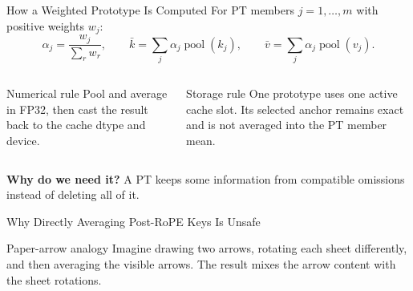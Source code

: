 \documentclass[aspectratio=169,10pt]{beamer}
\newcommand{\whylabel}{\textbf{Why do we need it?}}
\begin{document}
\begin{frame}{How a Weighted Prototype Is Computed}
\small
For PT members $j=1,\dots,m$ with positive weights $w_j$:
\[
\alpha_j=\frac{w_j}{\sum_rw_r},\qquad
\bar{k}=\sum_j\alpha_j\operatorname{pool}(k_j),\qquad
\bar{v}=\sum_j\alpha_j\operatorname{pool}(v_j).
\]
\begin{columns}[T,onlytextwidth]
\begin{block}{Numerical rule}
Pool and average in FP32, then cast the result back to the cache dtype and device.
\end{block}
\begin{block}{Storage rule}
One prototype uses one active cache slot. Its selected anchor remains exact and is not averaged
into the PT member mean.
\end{block}
\end{columns}
\begin{alertblock}{\whylabel}
A PT keeps some information from compatible omissions instead of deleting all of it.
\end{alertblock}
\end{frame}

\begin{frame}{Why Directly Averaging Post-RoPE Keys Is Unsafe}
\small
\begin{center}
\end{center}
\begin{exampleblock}{Paper-arrow analogy}
Imagine drawing two arrows, rotating each sheet differently, and then averaging the visible
arrows. The result mixes the arrow content with the sheet rotations.
\end{exampleblock}
\end{frame}
\end{document}
